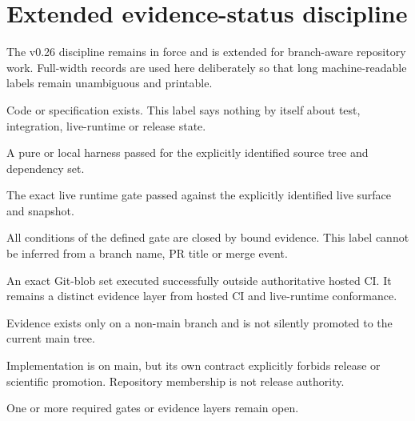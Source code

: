 \chapter{Extended evidence-status discipline}
The v0.26 discipline remains in force and is extended for branch-aware repository work. Full-width records are used here deliberately so that long machine-readable labels remain unambiguous and printable.

\begin{statusbox}{}
Code or specification exists. This label says nothing by itself about test, integration, live-runtime or release state.
\end{statusbox}

\begin{statusbox}{}
A pure or local harness passed for the explicitly identified source tree and dependency set.
\end{statusbox}

\begin{statusbox}{}
The exact live runtime gate passed against the explicitly identified live surface and snapshot.
\end{statusbox}

\begin{statusbox}{}
All conditions of the defined gate are closed by bound evidence. This label cannot be inferred from a branch name, PR title or merge event.
\end{statusbox}

\begin{statusbox}{}
An exact Git-blob set executed successfully outside authoritative hosted CI. It remains a distinct evidence layer from hosted CI and live-runtime conformance.
\end{statusbox}

\begin{statusbox}{}
Evidence exists only on a non-main branch and is not silently promoted to the current main tree.
\end{statusbox}

\begin{statusbox}{}
Implementation is on main, but its own contract explicitly forbids release or scientific promotion. Repository membership is not release authority.
\end{statusbox}

\begin{statusbox}{}
One or more required gates or evidence layers remain open.
\end{statusbox}

